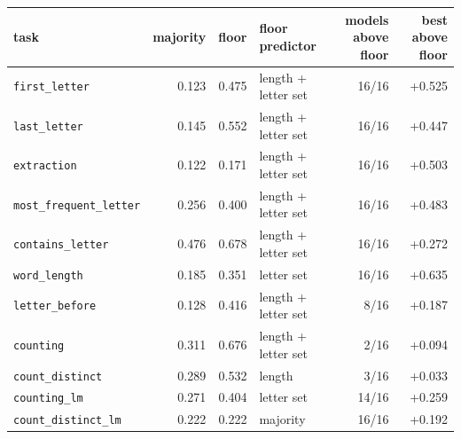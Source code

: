 \begin{tabular}{@{}lrrlrr@{}}
\toprule
task & majority & floor & floor predictor & models above floor & best above floor \\
\midrule
\texttt{first\_letter} & 0.123 & 0.475 & length + letter set & 16/16 & +0.525 \\
\texttt{last\_letter} & 0.145 & 0.552 & length + letter set & 16/16 & +0.447 \\
\texttt{extraction} & 0.122 & 0.171 & length + letter set & 16/16 & +0.503 \\
\texttt{most\_frequent\_letter} & 0.256 & 0.400 & length + letter set & 16/16 & +0.483 \\
\texttt{contains\_letter} & 0.476 & 0.678 & length + letter set & 16/16 & +0.272 \\
\texttt{word\_length} & 0.185 & 0.351 & letter set & 16/16 & +0.635 \\
\texttt{letter\_before} & 0.128 & 0.416 & length + letter set & 8/16 & +0.187 \\
\addlinespace[2pt]
\texttt{counting} & 0.311 & 0.676 & length + letter set & 2/16 & +0.094 \\
\texttt{count\_distinct} & 0.289 & 0.532 & length & 3/16 & +0.033 \\
\texttt{counting\_lm} & 0.271 & 0.404 & letter set & 14/16 & +0.259 \\
\texttt{count\_distinct\_lm} & 0.222 & 0.222 & majority & 16/16 & +0.192 \\
\bottomrule
\end{tabular}